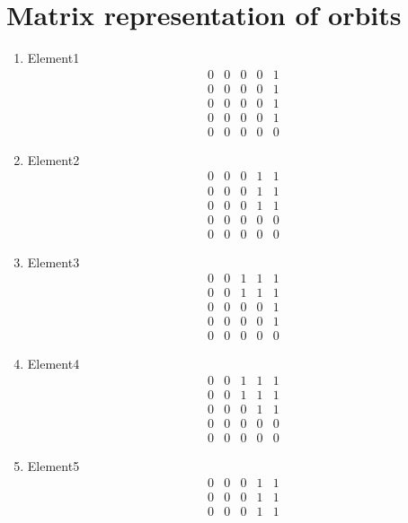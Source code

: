 \documentclass[12pt]{article}
\begin{document}
\section{Matrix representation of orbits}
\begin{multicols}{3}
\begin{enumerate}
\item Element1
\begin{equation*}
\begin{array}{ccccc}
0&0&0&0&1\\
0&0&0&0&1\\
0&0&0&0&1\\
0&0&0&0&1\\
0&0&0&0&0
\end{array}
\end{equation*}
\item Element2
\begin{equation*}
\begin{array}{ccccc}
0&0&0&1&1\\
0&0&0&1&1\\
0&0&0&1&1\\
0&0&0&0&0\\
0&0&0&0&0
\end{array}
\end{equation*}
\item Element3
\begin{equation*}
\begin{array}{ccccc}
0&0&1&1&1\\
0&0&1&1&1\\
0&0&0&0&1\\
0&0&0&0&1\\
0&0&0&0&0
\end{array}
\end{equation*}
\item Element4
\begin{equation*}
\begin{array}{ccccc}
0&0&1&1&1\\
0&0&1&1&1\\
0&0&0&1&1\\
0&0&0&0&0\\
0&0&0&0&0
\end{array}
\end{equation*}
\item Element5
\begin{equation*}
\begin{array}{ccccc}
0&0&0&1&1\\
0&0&0&1&1\\
0&0&0&1&1\\

\end{array}
\end{equation*}
\end{enumerate}
\end{multicols}
\end{document}
